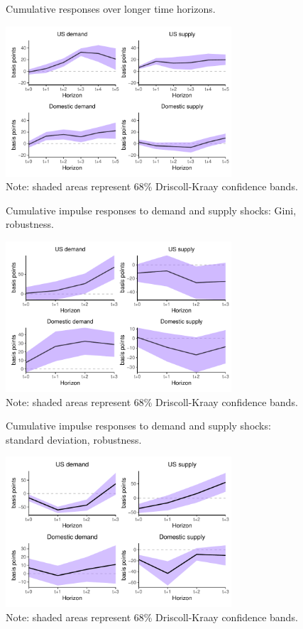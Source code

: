 \documentclass[12pt, a4paper]{article}
\begin{document}
\begin{figure}[H]
    \caption{Cumulative responses over longer time horizons.}
    \label{fig:irf_longer}
    \centering
    \includegraphics[width=0.75\textwidth]{Figures/baseline_demand_supply_LP5.pdf}
    \caption*{Note: shaded areas represent 68\% Driscoll-Kraay confidence bands.}
\end{figure}

\begin{figure}[H]
    \centering
    \caption{Cumulative impulse responses to demand and supply shocks: Gini, robustness.}
    \label{fig:demand_supply_robust}
    \includegraphics[width=0.75\textwidth]{Figures/robust_demand_supply_LP_extended.pdf}
    \centering \caption*{Note: shaded areas represent 68\% Driscoll-Kraay confidence bands.}
\end{figure}

\begin{figure}[H]
    \centering    
    \caption{Cumulative impulse responses to demand and supply shocks: standard deviation, robustness.}  
    \label{fig:std_robust}
    \includegraphics[width=0.75\textwidth]{Figures/std_demand_supply_LP_robust.pdf}
    \centering \caption*{Note: shaded areas represent 68\% Driscoll-Kraay confidence bands.}
\end{figure}
\end{document}
